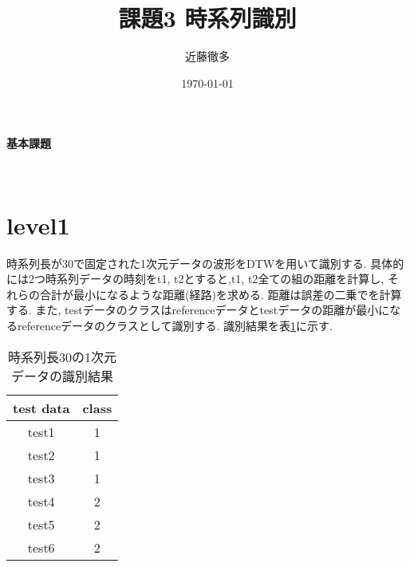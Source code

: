 
\graphicspath{{./pic/}}
\setlength{\textwidth}{16.2cm}%
\setlength{\textheight}{23cm}%
\setlength{\topmargin}{-1.5cm}
\setlength{\oddsidemargin}{0cm}
\setlength{\evensidemargin}{0cm}
\setlength{\parskip}{1pt}
\pagestyle{fancy}
\rhead[\today]{\today}
\title{課題3 時系列識別}
\author{近藤徹多}
\date{\today}



	\maketitle
	\vspace*{20pt}

	\begin{center}
		{\LARGE \bf 基本課題}
	\end{center}
　　　　\addtocounter{section}{-1}
	\section{level1}
        時系列長が30で固定された1次元データの波形をDTWを用いて識別する.
        具体的には2つ時系列データの時刻をt1, t2とすると,t1, t2全ての組の距離を計算し,
        それらの合計が最小になるような距離(経路)を求める.
        距離は誤差の二乗でを計算する.
        また, testデータのクラスはreferenceデータとtestデータの距離が最小になるreferenceデータのクラスとして識別する.
        識別結果を表\ref{tb:result1}に示す.

        \begin{table}[]
            \centering
            \caption{時系列長30の1次元データの識別結果}
            \begin{tabular}{|c|c|}
                \hline
                test data & class \\ \hline
                test1     & 1     \\ \hline
                test2     & 1     \\ \hline
                test3     & 1     \\ \hline
                test4     & 2     \\ \hline
                test5     & 2     \\ \hline
                test6     & 2     \\ \hline
            \end{tabular}
            \label{tb:result1}
        \end{table}



